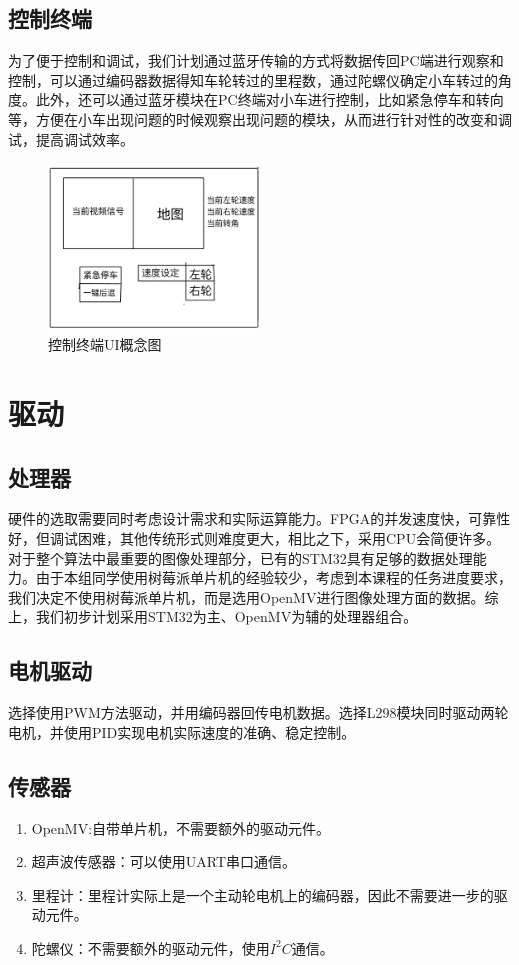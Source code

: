 \documentclass{report}
\begin{document}
\subsection{控制终端}
\label{subsec:label}
为了便于控制和调试，我们计划通过蓝牙传输的方式将数据传回PC端进行观察和控制，可以通过编码器数据得知车轮转过的里程数，通过陀螺仪确定小车转过的角度。此外，还可以通过蓝牙模块在PC终端对小车进行控制，比如紧急停车和转向等，方便在小车出现问题的时候观察出现问题的模块，从而进行针对性的改变和调试，提高调试效率。
\begin{figure}[ht]
  \centering
  \includegraphics[width=0.5\textwidth]{figures/ui.jpg}
  \caption{控制终端UI概念图 }
\end{figure}


\section{驱动}
\label{sec:label}
\subsection{处理器}
硬件的选取需要同时考虑设计需求和实际运算能力。FPGA的并发速度快，可靠性好，但调试困难，其他传统形式则难度更大，相比之下，采用CPU会简便许多。对于整个算法中最重要的图像处理部分，已有的STM32具有足够的数据处理能力。由于本组同学使用树莓派单片机的经验较少，考虑到本课程的任务进度要求，我们决定不使用树莓派单片机，而是选用OpenMV进行图像处理方面的数据。综上，我们初步计划采用STM32为主、OpenMV为辅的处理器组合。

\label{subsec:label}
\subsection{电机驱动}
\label{subsec:label}
选择使用PWM方法驱动，并用编码器回传电机数据。选择L298模块同时驱动两轮电机，并使用PID实现电机实际速度的准确、稳定控制。
\subsection{传感器}
\label{subsec:label}
\begin{enumerate}
\item OpenMV:自带单片机，不需要额外的驱动元件。
\item 超声波传感器：可以使用UART串口通信。
\item 里程计：里程计实际上是一个主动轮电机上的编码器，因此不需要进一步的驱动元件。
  \item 陀螺仪：不需要额外的驱动元件，使用$I^{2}C$通信。

  \end{enumerate}
  \newpage
\end{document}
